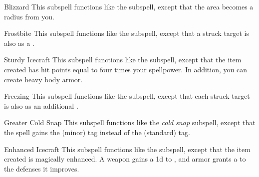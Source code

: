 \begin{ability}[\nth{3}]{Blizzard}
This subspell functions like the  subspell, except that the area becomes a \areamed radius from you.
\end{ability}
\vspace{0.25em}


\begin{ability}[\nth{4}]{Frostbite}
This subspell functions like the  subspell, except that a struck target is also  as a .
\end{ability}
\vspace{0.25em}


\begin{ability}[\nth{4}]{Sturdy Icecraft}
This subspell functions like the  subspell, except that the item created has hit points equal to four times your spellpower.
In addition, you can create heavy body armor.
\end{ability}
\vspace{0.25em}


\begin{ability}[\nth{5}]{Freezing}
This subspell functions like the  subspell, except that each struck target is also  as an additional .
\end{ability}
\vspace{0.25em}


\begin{ability}[\nth{5}]{Greater Cold Snap}
This subspell functions like the \textit{cold snap} subspell, except that the spell gains the  (minor) tag instead of the  (standard) tag.
\end{ability}
\vspace{0.25em}


\begin{ability}[\nth{6}]{Enhanced Icecraft}
This subspell functions like the  subspell, except that the item created is magically enhanced.
A weapon gains a \plus1d  to , and armor grants a   to the defenses it improves.
\end{ability}
\vspace{0.25em}

